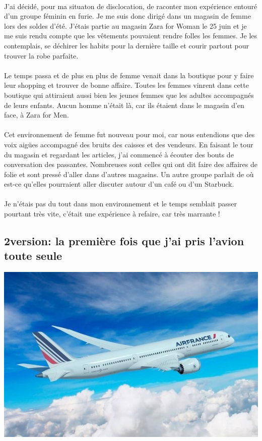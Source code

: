 \paragraph{}
J'ai décidé, pour ma situaton de disclocation, de raconter mon
expérience entouré d'un groupe féminin en furie. Je me suis donc
dirigé dans un magasin de femme lors des soldes d'été. J'étais partie
au magasin Zara for Woman le 25 juin et je me suis rendu compte que
les vêtements pouvaient rendre folles les femmes. Je les contemplais,
se déchirer les habits pour la dernière taille et courir partout pour
trouver la robe parfaite.
\paragraph{}
Le temps passa et de plus en plus de femme venait dans la boutique
pour y faire leur shopping et trouver de bonne affaire. Toutes les
femmes vinrent dans cette boutique qui attiraient aussi bien les jeunes
femmes que les adultes accompagnés de leurs enfants. Aucun homme
n'était là, car ils étaient dans le magasin d'en face, à Zara for Men.
\paragraph{}
Cet environnement de femme fut nouveau pour moi, car nous
entendions que des voix aigües accompagné des bruits des caisses et
des vendeurs. En faisant le tour du magasin et regardant les articles,
j'ai commencé à écouter des bouts de conversation des passantes.
Nombreuses sont celles qui ont dit faire des affaires de folie et sont
pressé d'aller dans d'autres magasins. Un autre groupe parlait de où
est-ce qu'elles pourraient aller discuter autour d'un café ou d'un
Starbuck.
\paragraph{}
Je n’étais pas du tout dans mon environnement et le temps semblait
passer pourtant très vite, c’était une expérience à refaire, car très
marrante !

\subsection{2\ieme version: la première fois que j’ai pris l’avion toute seule}
\begin{center}
\includegraphics[scale=0.6]{avion.jpg}
\end{center}

